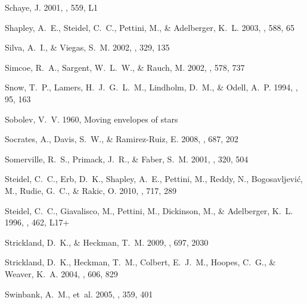 \documentclass[]{emulateapj}
\begin{document}
\begin{thebibliography}{74}
{Schaye}, J. 2001, \apjl, 559, L1

{Shapley}, A.~E., {Steidel}, C.~C., {Pettini}, M., \& {Adelberger}, K.~L. 2003,
  \apj, 588, 65

{Silva}, A.~I., \& {Viegas}, S.~M. 2002, \mnras, 329, 135

{Simcoe}, R.~A., {Sargent}, W.~L.~W., \& {Rauch}, M. 2002, \apj, 578, 737

{Snow}, T.~P., {Lamers}, H.~J.~G.~L.~M., {Lindholm}, D.~M., \& {Odell}, A.~P.
  1994, \apjs, 95, 163

{Sobolev}, V.~V. 1960, {Moving envelopes of stars}

{Socrates}, A., {Davis}, S.~W., \& {Ramirez-Ruiz}, E. 2008, \apj, 687, 202

{Somerville}, R.~S., {Primack}, J.~R., \& {Faber}, S.~M. 2001, \mnras, 320, 504

{Steidel}, C.~C., {Erb}, D.~K., {Shapley}, A.~E., {Pettini}, M., {Reddy}, N.,
  {Bogosavljevi{\'c}}, M., {Rudie}, G.~C., \& {Rakic}, O. 2010, \apj, 717, 289

{Steidel}, C.~C., {Giavalisco}, M., {Pettini}, M., {Dickinson}, M., \&
  {Adelberger}, K.~L. 1996, \apjl, 462, L17+

{Strickland}, D.~K., \& {Heckman}, T.~M. 2009, \apj, 697, 2030

{Strickland}, D.~K., {Heckman}, T.~M., {Colbert}, E.~J.~M., {Hoopes}, C.~G., \&
  {Weaver}, K.~A. 2004, \apj, 606, 829

{Swinbank}, A.~M., {et~al.} 2005, \mnras, 359, 401


\end{thebibliography}
\end{document}
